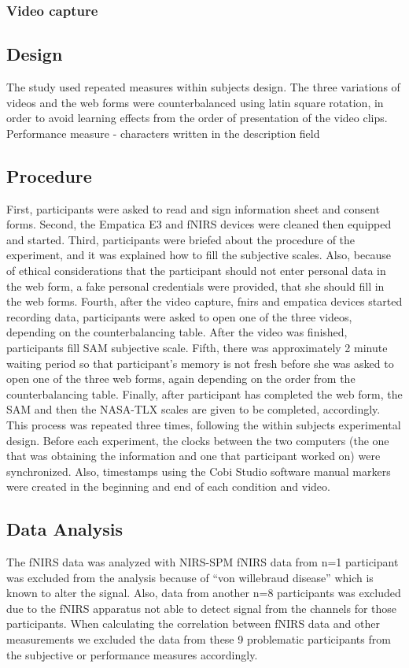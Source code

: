 \documentclass[a4paper]{report}
\begin{document}
			\subsubsection{Video capture}
		\subsection{Design}
		The study used repeated measures within subjects design. The three variations of videos and the web forms were counterbalanced using latin square rotation, in order to avoid learning effects from the order of presentation of the video clips.
		Performance measure - characters written in the description field
		\subsection{Procedure}
		First, participants were asked to read and sign information sheet and consent forms. Second, the Empatica E3 and fNIRS devices were cleaned then equipped and started. Third, participants were briefed about the procedure of the experiment, and it was explained how to fill the subjective scales. Also, because of ethical considerations that the participant should not enter personal data in the web form, a fake personal credentials were provided, that she should fill in the web forms. Fourth, after the video capture, fnirs and empatica devices started recording data, participants were asked to open one of the three videos, depending on the counterbalancing table. After the video was finished, participants fill SAM subjective scale. Fifth, there was approximately 2 minute waiting period so that participant's memory is not fresh before she was asked to open one of the three web forms, again depending on the order from the counterbalancing table. Finally, after participant has completed the web form, the SAM and then the NASA-TLX scales are given to be completed, accordingly. This process was repeated three times, following the within subjects experimental design.
		Before each experiment, the clocks between the two computers (the one that was obtaining the information and one that participant worked on) were synchronized. Also, timestamps using the Cobi Studio software manual markers were created in the beginning and end of each condition and video. 
		\subsection{Data Analysis}
		The fNIRS data was analyzed with NIRS-SPM\cite{ye2009nirs}		
		fNIRS data from n=1 participant was excluded from the analysis because of ``von willebraud disease'' which is known to alter the signal. Also, data from another n=8 participants was excluded due to the fNIRS apparatus not able to detect signal from the channels for those participants. When calculating the correlation between fNIRS data and other measurements we excluded the data from these 9 problematic participants from the subjective or performance measures accordingly.
\end{document}
